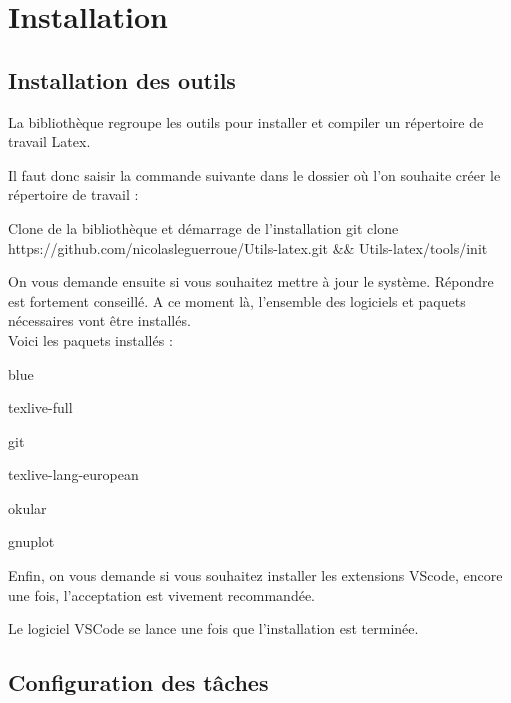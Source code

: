 \chapter{Installation}

\section{Installation des outils}


La bibliothèque  regroupe les outils pour installer et compiler un répertoire de travail Latex.

Il faut donc saisir la commande suivante dans le dossier où l'on souhaite créer le répertoire de travail : 

\begin{Bash}{Clone de la bibliothèque et démarrage de l'installation}
git clone https://github.com/nicolasleguerroue/Utils-latex.git && Utils-latex/tools/init
\end{Bash}

On vous demande ensuite si vous souhaitez mettre à jour le système.
Répondre  est fortement conseillé. A ce moment là, l'ensemble des logiciels et paquets nécessaires vont être installés.\\
Voici les paquets installés : \\
\begin{items}{blue}{\faviconLeaf}
\item texlive-full
\item git
\item texlive-lang-european
\item okular
\item gnuplot
\end{items}

Enfin, on vous demande si vous souhaitez installer les extensions VScode, encore une fois, l'acceptation est vivement recommandée.

Le logiciel VSCode se lance une fois que l'installation est terminée.


\section{Configuration des tâches}

